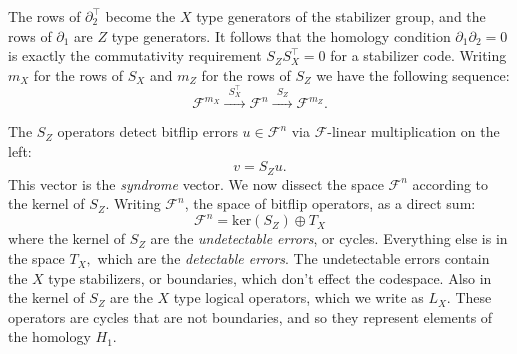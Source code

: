 \documentclass[11pt,twoside,openright]{report}
\newcommand{\Field}{\mathcal{F}}
\def\Ker{\mathrm{ker}}
\begin{document}

The rows of $\partial_2^\top$ become the $X$ type generators of
the stabilizer group, and the rows of $\partial_1$ are $Z$ type
generators.
It follows that 
the homology condition $\partial_1\partial_2 = 0$ is
exactly the commutativity requirement $S_Z S_X^\top = 0$ for
a stabilizer code.
Writing $m_X$ for the rows of $S_X$ and $m_Z$ for the rows
of $S_Z$ we have the following sequence:
$$
    \Field^{m_X} \xrightarrow{\ \ S_X^\top\ \ } 
    \Field^{n} \xrightarrow{\ \ S_Z\ \ } 
    \Field^{m_Z}.
$$

The $S_Z$ operators detect bitflip errors $u\in\Field^n$
via $\Field$-linear multiplication on the left:
$$
    v = S_Zu.
$$
This vector is the \emph{syndrome} vector.
We now dissect the space $\Field^n$ according to the kernel of $S_Z$.
Writing $\Field^n$, the space of bitflip operators,
as a direct sum:
$$
    \Field^n = \Ker(S_Z) \oplus T_X
$$
where the kernel of $S_Z$ are the \emph{undetectable errors}, or cycles.
Everything else is in 
the space $T_X,$ which are the \emph{detectable errors}.
The undetectable errors contain the $X$ type stabilizers, or boundaries,
which don't effect the codespace.
Also in the kernel of $S_Z$ are the $X$ type logical operators, which 
we write as $L_X.$
These operators are cycles that are not boundaries, and so they represent
elements of the homology $H_1.$
\end{document}
